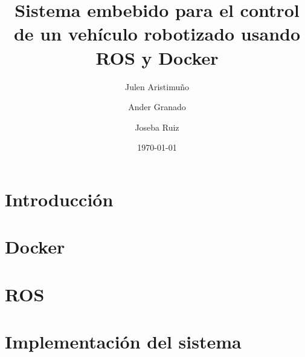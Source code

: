 \documentclass[a4paper,12pt,oneside]{scrbook}
\title{Sistema embebido para el control de un vehículo robotizado usando ROS y Docker}
\author{Julen Aristimuño \and Ander Granado \and Joseba Ruiz}
\date{\today}
\begin{document}
\frontmatter %

\tableofcontents %
\listoffigures %


\mainmatter %
\part{Introducción}
	
	

\part{Docker}
	
	

\part{ROS}
	
	
	
\part{Implementación del sistema}
	


\backmatter



\end{document}

